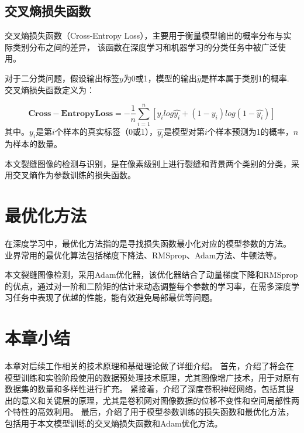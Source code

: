 \subsection{交叉熵损失函数}
交叉熵损失函数（Cross-Entropy Loss），主要用于衡量模型输出的概率分布与实际类别分布之间的差异，
该函数在深度学习和机器学习的分类任务中被广泛使用。

对于二分类问题，假设输出标签$y$为0或1，模型的输出$\hat{y}$是样本属于类别1的概率.
交叉熵损失函数定义为：

\begin{equation}
	\mathbf{Cross-Entropy Loss}=-\frac{1}{n}\sum_{i=1}^{n}[{y_i}log{\hat{y_i}} + (1-y_i)log(1-\hat{y_i})]
\end{equation}
其中。$y_i$是第$i$个样本的真实标签（0或1），$\hat{y_i}$是模型对第$i$个样本预测为1的概率，$n$为样本的数量。

本文裂缝图像的检测与识别，是在像素级别上进行裂缝和背景两个类别的分类，采用交叉熵作为参数训练的损失函数。


\section{最优化方法}
在深度学习中，最优化方法指的是寻找损失函数最小化对应的模型参数的方法。
业界常用的最优化算法包括梯度下降法、RMSprop、Adam方法、牛顿法等。

本文裂缝图像检测，采用Adam优化器，该优化器结合了动量梯度下降和RMSprop的优点，通过对一阶和二阶矩的估计来动态调整每个参数的学习率，在需多深度学习任务中表现了优越的性能，能有效避免局部最优等问题。

\section{本章小结}
本章对后续工作相关的技术原理和基础理论做了详细介绍。
首先，介绍了将会在模型训练和实验阶段使用的数据预处理技术原理，尤其图像增广技术，用于对原有数据集的数量和多样性进行扩充。
紧接着，介绍了深度卷积神经网络，包括其提出的意义和关键层的原理，尤其是卷积网对图像数据的位移不变性和空间局部性两个特性的高效利用。
最后，介绍了用于模型参数训练的损失函数和最优化方法，包括用于本文模型训练的交叉熵损失函数和Adam优化方法。